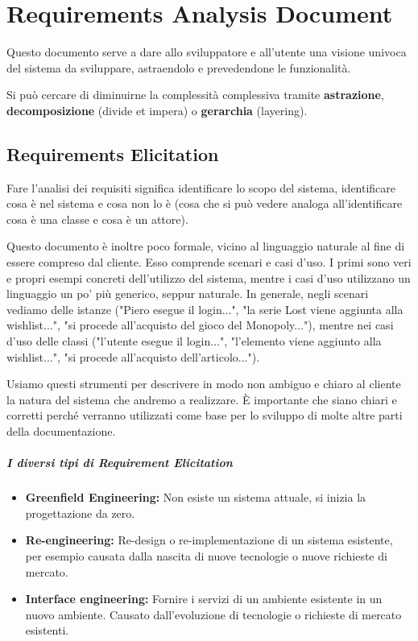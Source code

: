 \chapter{Requirements Analysis Document}

    Questo documento serve a dare allo sviluppatore e all'utente una visione univoca del sistema da sviluppare, astraendolo e prevedendone le funzionalità.
    
    Si può cercare di diminuirne la complessità complessiva tramite \textbf{astrazione}, \textbf{decomposizione} (divide et impera) o \textbf{gerarchia} (layering).

\section{Requirements Elicitation}
    
    Fare l'analisi dei requisiti significa identificare lo scopo del sistema, identificare cosa è nel sistema e cosa non lo è (cosa che si può vedere analoga all'identificare cosa è una classe e cosa è un attore).
    
    Questo documento è inoltre poco formale, vicino al linguaggio naturale al fine di essere compreso dal cliente. Esso comprende scenari e casi d'uso. I primi sono veri e propri esempi concreti dell'utilizzo del sistema, mentre i casi d'uso utilizzano un linguaggio un po' più generico, seppur naturale. In generale, negli scenari vediamo delle istanze ("Piero esegue il login...", "la serie Lost viene aggiunta alla wishlist...", "si procede all'acquisto del gioco del Monopoly..."), mentre nei casi d'uso delle classi ("l'utente esegue il login...", "l'elemento viene aggiunto alla wishlist...", "si procede all'acquisto dell'articolo...").
    
    Usiamo questi strumenti per descrivere in modo non ambiguo e chiaro al cliente la natura del sistema che andremo a realizzare. È importante che siano chiari e corretti perché verranno utilizzati come base per lo sviluppo di molte altre parti della documentazione.
    
    \paragraph{I diversi tipi di Requirement Elicitation}
    \begin{itemize}
        \item \textbf{Greenfield Engineering:} Non esiste un sistema attuale, si inizia la progettazione da zero.
        \item \textbf{Re-engineering:} Re-design o re-implementazione di un sistema esistente, per esempio causata dalla nascita di nuove tecnologie o nuove richieste di mercato.
        \item \textbf{Interface engineering:} Fornire i servizi di un ambiente esistente in un nuovo ambiente. Causato dall'evoluzione di tecnologie o richieste di mercato esistenti.
    \end{itemize}
    
